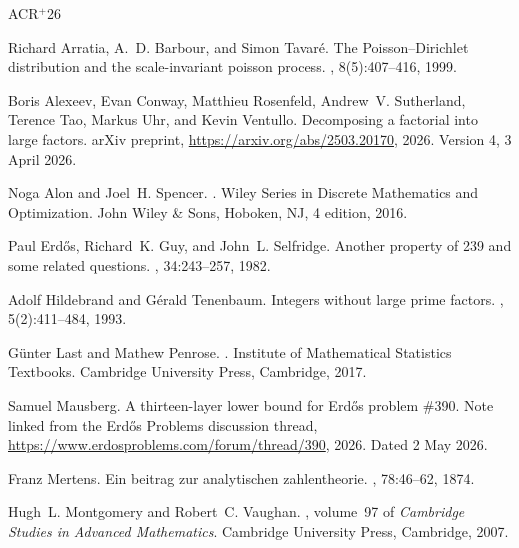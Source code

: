 \documentclass[11pt]{article}
\numberwithin{equation}{section}
\theoremstyle{definition}
\theoremstyle{remark}
\newcommand{\1}{\mathbf 1}
\begin{document}

\newcommand{\etalchar}[1]{$^{#1}$}
\begin{thebibliography}{ACR{\etalchar{+}}26}

Richard Arratia, A.~D. Barbour, and Simon Tavar{\'e}.
\newblock The {Poisson--Dirichlet} distribution and the scale-invariant poisson
  process.
, 8(5):407--416, 1999.

\bibitem[ACR{\etalchar{+}}26]{AlexeevEtAl2026}
Boris Alexeev, Evan Conway, Matthieu Rosenfeld, Andrew~V. Sutherland, Terence
  Tao, Markus Uhr, and Kevin Ventullo.
\newblock Decomposing a factorial into large factors.
\newblock arXiv preprint, \url{https://arxiv.org/abs/2503.20170}, 2026.
\newblock Version 4, 3 April 2026.

Noga Alon and Joel~H. Spencer.
.
\newblock Wiley Series in Discrete Mathematics and Optimization. John Wiley \&
  Sons, Hoboken, NJ, 4 edition, 2016.

Paul Erd{\H{o}}s, Richard~K. Guy, and John~L. Selfridge.
\newblock Another property of 239 and some related questions.
, 34:243--257, 1982.

Adolf Hildebrand and G{\'e}rald Tenenbaum.
\newblock Integers without large prime factors.
, 5(2):411--484,
  1993.

G{\"u}nter Last and Mathew Penrose.
.
\newblock Institute of Mathematical Statistics Textbooks. Cambridge University
  Press, Cambridge, 2017.

Samuel Mausberg.
\newblock A thirteen-layer lower bound for {Erd\H{o}s} problem \#390.
\newblock Note linked from the Erd\H{o}s Problems discussion thread,
  \url{https://www.erdosproblems.com/forum/thread/390}, 2026.
\newblock Dated 2 May 2026.

Franz Mertens.
\newblock Ein beitrag zur analytischen zahlentheorie.
, 78:46--62,
  1874.

Hugh~L. Montgomery and Robert~C. Vaughan.
, volume~97 of
  {\em Cambridge Studies in Advanced Mathematics}.
\newblock Cambridge University Press, Cambridge, 2007.


\end{thebibliography}
\end{document}
